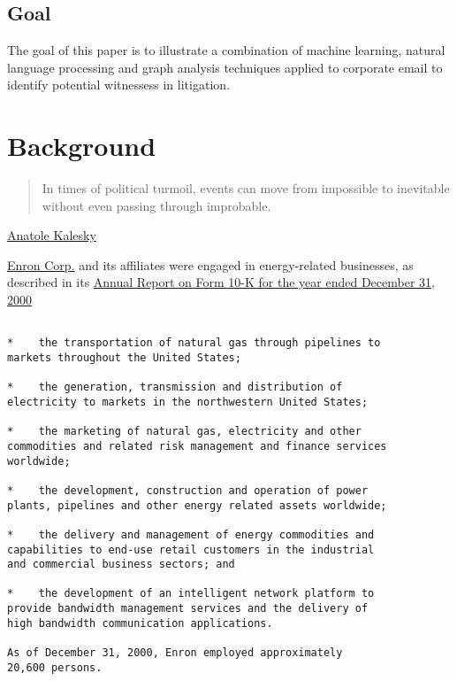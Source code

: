 \documentclass[]{article}
\begin{document}
\hypertarget{goal}{%
\subsection{Goal}\label{goal}}

The goal of this paper is to illustrate a combination of machine
learning, natural language processing and graph analysis techniques
applied to corporate email to identify potential witnessess in
litigation.

\hypertarget{background}{%
\section{Background}\label{background}}

\begin{quote}
In times of political turmoil, events can move from impossible to
inevitable without even passing through improbable.
\end{quote}

\href{https://www.project-syndicate.org/commentary/canceling-brexit-becoming-inevitable-by-anatole-kaletsky-2018-12}{Anatole
Kalesky}

\href{https://en.wikipedia.org/wiki/Enron}{Enron Corp.} and its
affiliates were engaged in energy-related businesses, as described in
its
\href{https://www.sec.gov/Archives/edgar/data/1024401/000102440101500010/ene10-k.txt}{Annual
Report on Form 10-K for the year ended December 31, 2000}

\begin{Verbatim}[frame=single]

*    the transportation of natural gas through pipelines to
markets throughout the United States;

*    the generation, transmission and distribution of
electricity to markets in the northwestern United States;

*    the marketing of natural gas, electricity and other
commodities and related risk management and finance services
worldwide;

*    the development, construction and operation of power
plants, pipelines and other energy related assets worldwide;

*    the delivery and management of energy commodities and
capabilities to end-use retail customers in the industrial
and commercial business sectors; and

*    the development of an intelligent network platform to
provide bandwidth management services and the delivery of
high bandwidth communication applications.

As of December 31, 2000, Enron employed approximately
20,600 persons.

    \end{Verbatim}
\end{document}
